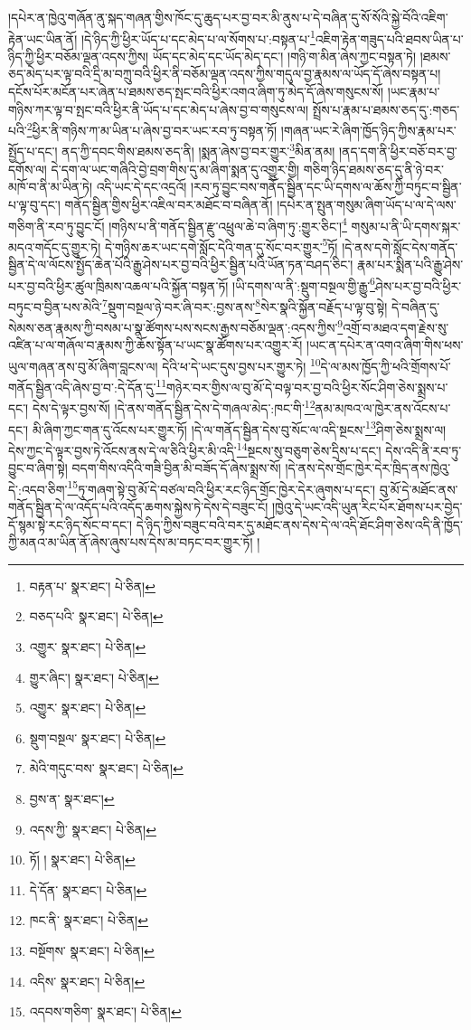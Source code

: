 །དཔེར་ན་ཁྱེའུ་གཞོན་ནུ་སྐད་གཞན་གྱིས་ཁོང་དུ་ཆུད་པར་བྱ་བར་མི་ནུས་པ་དེ་བཞིན་དུ་སོ་སོའི་སྐྱེ་བོའི་འཇིག་རྟེན་ཡང་ཡིན་ནོ། །དེ་ཉིད་ཀྱི་ཕྱིར་ཡོད་པ་དང་མེད་པ་ལ་སོགས་པ་:བསྟན་པ་\footnote{བརྟན་པ་  སྣར་ཐང་།  པེ་ཅིན། }འཇིག་རྟེན་གཟུད་པའི་ཐབས་ཡིན་པ་ཉིད་ཀྱི་ཕྱིར་བཅོམ་ལྡན་འདས་ཀྱིས། ཡོད་དང་མེད་དང་ཡོད་མེད་དང་། །གཉི་ག་མིན་ཞེས་ཀྱང་བསྟན་ཏེ། །ཐམས་ཅད་མེད་པར་ལྟ་བའི་དྲི་མ་བཀྲུ་བའི་ཕྱིར་ནི་བཅོམ་ལྡན་འདས་ཀྱིས་གདུལ་བྱ་རྣམས་ལ་ཡོད་དོ་ཞེས་བསྟན་པ། དངོས་པོར་མངོན་པར་ཞེན་པ་ཐམས་ཅད་སྤང་བའི་ཕྱིར་འགའ་ཞིག་ཏུ་མེད་དོ་ཞེས་གསུངས་སོ། །ཡང་རྣམ་པ་གཉིས་ཀར་ལྟ་བ་སྤང་བའི་ཕྱིར་ནི་ཡོད་པ་དང་མེད་པ་ཞེས་བྱ་བ་གསུངས་ལ། སྤྲོས་པ་རྣམ་པ་ཐམས་ཅད་དུ་:གཅད་པའི་\footnote{བཅད་པའི་  སྣར་ཐང་།  པེ་ཅིན། }ཕྱིར་ནི་གཉིས་ཀ་མ་ཡིན་པ་ཞེས་བྱ་བར་ཡང་རབ་ཏུ་བསྟན་ཏོ། །གཞན་ཡང་རེ་ཞིག་ཁྱོད་ཉིད་ཀྱིས་རྣམ་པར་སྤྱོད་པ་དང་། ནད་ཀྱི་དབང་གིས་ཐམས་ཅད་ནི། །སྨན་ཞེས་བྱ་བར་གྱུར་\footnote{འགྱུར་  སྣར་ཐང་།  པེ་ཅིན། }མིན་ནམ། །ནད་དག་ནི་ཕྱིར་བཅོ་བར་བྱ་དགོས་ལ། དེ་དག་ལ་ཡང་གཞིའི་བྱེ་བྲག་གིས་དུ་མ་ཞིག་སྨན་དུ་འགྱུར་གྱི། གཅིག་ཉིད་ཐམས་ཅད་དུ་ནི་ཉེ་བར་མཁོ་བ་ནི་མ་ཡིན་ཏེ། འདི་ཡང་དེ་དང་འདྲའོ། །རབ་ཏུ་བྱུང་བས་གནོད་སྦྱིན་དང་ཡི་དགས་ལ་ཆོས་ཀྱི་བཏུང་བ་སྦྱིན་པ་ལྟ་བུ་དང་། གནོད་སྦྱིན་གྱིས་ཕྱིར་འཇིལ་བར་མཐོང་བ་བཞིན་ནོ། །དཔེར་ན་སྤུན་གསུམ་ཞིག་ཡོད་པ་ལ་དེ་ལས་གཅིག་ནི་རབ་ཏུ་བྱུང་ངོ། །གཉིས་པ་ནི་གནོད་སྦྱིན་རྫུ་འཕྲུལ་ཆེ་བ་ཞིག་ཏུ་:གྱུར་ཅིང་།\footnote{གྱུར་ཞིང་།  སྣར་ཐང་།  པེ་ཅིན། } གསུམ་པ་ནི་ཡི་དགས་སྐར་མདའ་གདོང་དུ་གྱུར་ཏེ། དེ་གཉིས་ཆར་ཡང་དགེ་སློང་དེའི་གན་དུ་སོང་བར་གྱུར་\footnote{འགྱུར་  སྣར་ཐང་།  པེ་ཅིན། }ཏོ། །དེ་ནས་དགེ་སློང་དེས་གནོད་སྦྱིན་དེ་ལ་ལོངས་སྤྱོད་ཆེན་པོའི་རྒྱུ་ཤེས་པར་བྱ་བའི་ཕྱིར་སྦྱིན་པའི་ཡོན་ཏན་བཤད་ཅིང་། རྣམ་པར་སྨིན་པའི་རྒྱུ་ཤེས་པར་བྱ་བའི་ཕྱིར་ཚུལ་ཁྲིམས་འཆལ་པའི་སྐྱོན་བསྟན་ཏོ། །ཡི་དགས་ལ་ནི་:སྡུག་བསྔལ་གྱི་རྒྱུ་\footnote{སྡུག་བསྔལ་  སྣར་ཐང་།  པེ་ཅིན། }ཤེས་པར་བྱ་བའི་ཕྱིར་བཏུང་བ་བྱིན་པས་མེའི་\footnote{མེའི་གདུང་བས་  སྣར་ཐང་།  པེ་ཅིན། }སྡུག་བསྔལ་ཉེ་བར་ཞི་བར་:བྱས་ནས་\footnote{བྱས་ན་  སྣར་ཐང་། }སེར་སྣའི་སྐྱོན་བརྗོད་པ་ལྟ་བུ་སྟེ། དེ་བཞིན་དུ་སེམས་ཅན་རྣམས་ཀྱི་བསམ་པ་སྣ་ཚོགས་པས་སངས་རྒྱས་བཅོམ་ལྡན་:འདས་ཀྱིས་\footnote{འདས་ཀྱི་  སྣར་ཐང་།  པེ་ཅིན། }འགྲོ་བ་མཐའ་དག་རྗེས་སུ་འཛིན་པ་ལ་གཞོལ་བ་རྣམས་ཀྱི་ཆོས་སྟོན་པ་ཡང་སྣ་ཚོགས་པར་འགྱུར་རོ། །ཡང་ན་དཔེར་ན་འགའ་ཞིག་གིས་ཕས་ཡུལ་གཞན་ནས་བུ་མོ་ཞིག་བླངས་ལ། དེའི་ཕ་དེ་ཡང་དུས་བྱས་པར་གྱུར་ཏེ། \footnote{ཏོ། །   སྣར་ཐང་།  པེ་ཅིན། }དེ་ལ་མས་ཁྱོད་ཀྱི་ཕའི་གྲོགས་པོ་གནོད་སྦྱིན་འདི་ཞེས་བྱ་བ་:དེ་དོན་དུ་\footnote{དེ་དོན་  སྣར་ཐང་།  པེ་ཅིན། }གཉེར་བར་གྱིས་ལ་བུ་མོ་དེ་བལྟ་བར་བྱ་བའི་ཕྱིར་སོང་ཤིག་ཅེས་སྨྲས་པ་དང་། དེས་དེ་ལྟར་བྱས་སོ། །དེ་ནས་གནོད་སྦྱིན་དེས་དེ་གཞལ་མེད་:ཁང་གི་\footnote{ཁང་ནི་  སྣར་ཐང་།  པེ་ཅིན། }ནམ་མཁའ་ལ་ཁྱེར་ནས་འོངས་པ་དང་། མི་ཞིག་ཀྱང་གན་དུ་འོངས་པར་གྱུར་ཏོ། །དེ་ལ་གནོད་སྦྱིན་དེས་བུ་སོང་ལ་འདི་སྔངས་\footnote{བསྔོགས་  སྣར་ཐང་།  པེ་ཅིན། }ཤིག་ཅེས་སྨྲས་ལ། དེས་ཀྱང་དེ་ལྟར་བྱས་ཏེ་འོངས་ནས་དེ་ལ་ཅིའི་ཕྱིར་མི་འདི་\footnote{འདིས་  སྣར་ཐང་།  པེ་ཅིན། }སྔངས་སུ་བཅུག་ཅེས་དྲིས་པ་དང་། དེས་འདི་ནི་རབ་ཏུ་བྱུང་བ་ཞིག་སྟེ། བདག་གིས་འདིའི་གཟི་བྱིན་མི་བཟོད་དོ་ཞེས་སྨྲས་སོ། །དེ་ནས་དེས་གྲོང་ཁྱེར་དེར་ཁྲིད་ནས་ཁྱེའུ་དེ་:འདབ་ཅིག་\footnote{འདབས་གཅིག་  སྣར་ཐང་།  པེ་ཅིན། }ཏུ་གཞག་སྟེ་བུ་མོ་དེ་བཙལ་བའི་ཕྱིར་རང་ཉིད་གྲོང་ཁྱེར་དེར་ཞུགས་པ་དང་། བུ་མོ་དེ་མཐོང་ནས་གནོད་སྦྱིན་དེ་ལ་འདོད་པའི་འདོད་ཆགས་སྐྱེས་ཏེ་དེས་དེ་བཟུང་ངོ། །ཁྱེའུ་དེ་ཡང་འདི་ཡུན་རིང་པོར་ཐོགས་པར་བྱེད་དོ་སྙམ་སྟེ་རང་ཉིད་སོང་བ་དང་། དེ་ཉིད་ཀྱིས་བཟུང་བའི་བར་དུ་མཐོང་ནས་དེས་དེ་ལ་འདི་ཐོང་ཤིག་ཅེས་འདི་ནི་ཁྱོད་ཀྱི་མནའ་མ་ཡིན་ནོ་ཞེས་ཞུས་པས་དེས་མ་བཏང་བར་གྱུར་ཏོ། །
